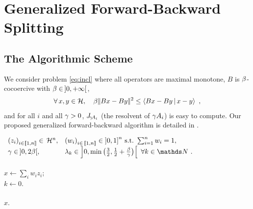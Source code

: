 \section{Generalized Forward-Backward Splitting}
\label{sec:gfb}

\subsection{The Algorithmic Scheme}
\label{sec:algo}

We consider problem \eqref{eq:incl} where all operators are maximal monotone, $B$ is $\beta$-cocoercive with $\be \in \, ]0,\pinfty[$, \ie
%
\begin{equation*}\label{eq:coco}
	\foralls x,y \in \Hh, \quad \be \norm{Bx - By}^2 \leq \dprod{Bx - By}{x - y}~,
\end{equation*}
% 
and for all $i$ and all $\gamma > 0$, $J_{\!\gamma\!A_i}$ (the resolvent of $\gamma A_i$) is easy to compute. Our proposed generalized forward-backward algorithm is detailed in . 

\begin{algorithm}[h]
\caption{A Generalized Forward-Backward Algorithm for solving \eqref{eq:incl}.\newline
$\be \in \, ]0,\pinfty[$ is a cocoercivity constant of $B$.}
{}
 $\begin{array}{ll}
 {\pa{z_i}_{i \in \bbket{1,n}} \in \, \Hh^n}, & {\pa{w_i}_{i \in \, \bbket{1,n}} \in {]0,1]}^n \sobjs{s.t.} \sum_{i=1}^n w_i = 1}, \\
							    \ga \in \, ]0,2\be[, & \la_k \in \left] 0,\min\bpa{\frac{3}{2},\textfrac{1}{2}+\textfrac{\be}{\ga}} \right[ ~ \forall k \in \N ~. \end{array}$\\
{}\\
$x \leftarrow \sum_i w_i z_i$;\\
$k \leftarrow 0$.\\
{}\\
{} $x$.
\label{algo:gfb}
\end{algorithm}

